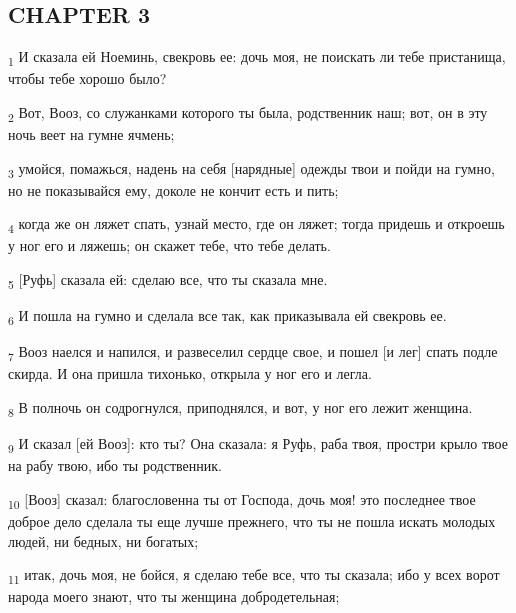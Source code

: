 \subsection{CHAPTER 3}
\begin{tcolorbox}
\textsubscript{1} И сказала ей Ноеминь, свекровь ее: дочь моя, не поискать ли тебе пристанища, чтобы тебе хорошо было?
\end{tcolorbox}
\begin{tcolorbox}
\textsubscript{2} Вот, Вооз, со служанками которого ты была, родственник наш; вот, он в эту ночь веет на гумне ячмень;
\end{tcolorbox}
\begin{tcolorbox}
\textsubscript{3} умойся, помажься, надень на себя [нарядные] одежды твои и пойди на гумно, но не показывайся ему, доколе не кончит есть и пить;
\end{tcolorbox}
\begin{tcolorbox}
\textsubscript{4} когда же он ляжет спать, узнай место, где он ляжет; тогда придешь и откроешь у ног его и ляжешь; он скажет тебе, что тебе делать.
\end{tcolorbox}
\begin{tcolorbox}
\textsubscript{5} [Руфь] сказала ей: сделаю все, что ты сказала мне.
\end{tcolorbox}
\begin{tcolorbox}
\textsubscript{6} И пошла на гумно и сделала все так, как приказывала ей свекровь ее.
\end{tcolorbox}
\begin{tcolorbox}
\textsubscript{7} Вооз наелся и напился, и развеселил сердце свое, и пошел [и лег] спать подле скирда. И она пришла тихонько, открыла у ног его и легла.
\end{tcolorbox}
\begin{tcolorbox}
\textsubscript{8} В полночь он содрогнулся, приподнялся, и вот, у ног его лежит женщина.
\end{tcolorbox}
\begin{tcolorbox}
\textsubscript{9} И сказал [ей Вооз]: кто ты? Она сказала: я Руфь, раба твоя, простри крыло твое на рабу твою, ибо ты родственник.
\end{tcolorbox}
\begin{tcolorbox}
\textsubscript{10} [Вооз] сказал: благословенна ты от Господа, дочь моя! это последнее твое доброе дело сделала ты еще лучше прежнего, что ты не пошла искать молодых людей, ни бедных, ни богатых;
\end{tcolorbox}
\begin{tcolorbox}
\textsubscript{11} итак, дочь моя, не бойся, я сделаю тебе все, что ты сказала; ибо у всех ворот народа моего знают, что ты женщина добродетельная;
\end{tcolorbox}
